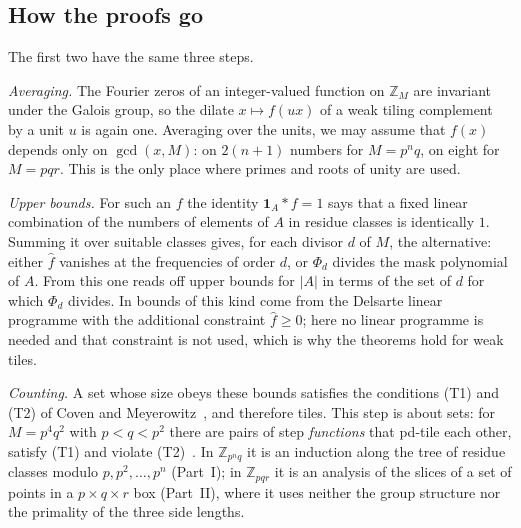 \documentclass[11pt,a4paper]{amsart}
\theoremstyle{definition}
\theoremstyle{remark}
\newcommand{\Z}{\mathbb{Z}}
\newcommand{\one}{\mathbf{1}}
\begin{document}
\subsection*{How the proofs go} The first two have the same three steps.

\emph{Averaging.} The Fourier zeros of an integer-valued function on $\Z_M$ are invariant under the Galois
group, so the dilate $x\mapsto f(ux)$ of a weak tiling complement by a unit $u$ is again one. Averaging over the
units, we may assume that $f(x)$ depends only on $\gcd(x,M)$: on $2(n+1)$ numbers for $M=p^nq$, on eight for
$M=pqr$. This is the only place where primes and roots of unity are used.

\emph{Upper bounds.} For such an $f$ the identity $\one_A*f=1$ says that a fixed linear combination of the
numbers of elements of $A$ in residue classes is identically $1$. Summing it over suitable classes gives, for
each divisor $d$ of $M$, the alternative: either $\hat f$ vanishes at the frequencies of order $d$, or $\Phi_d$
divides the mask polynomial of $A$. From this one reads off upper bounds for $|A|$ in terms of the set of $d$
for which $\Phi_d$ divides. In \cite{KLMS,KF} bounds of this kind come from the Delsarte linear programme with
the additional constraint $\hat f\ge 0$; here no linear programme is needed and that constraint is not used,
which is why the theorems hold for weak tiles.

\emph{Counting.} A set whose size obeys these bounds satisfies the conditions (T1) and (T2) of Coven and
Meyerowitz~\cite{CM}, and therefore tiles. This step is about sets: for $M=p^4q^2$ with $p<q<p^2$ there are pairs of
step \emph{functions} that pd-tile each other, satisfy (T1) and violate (T2)~\cite{KLMS}. In $\Z_{p^nq}$ it is an induction along
the tree of residue classes modulo $p,p^2,\dots,p^n$ (Part~I); in $\Z_{pqr}$ it is an analysis of the slices of
a set of points in a $p\times q\times r$ box (Part~II), where it uses neither the group structure nor the
primality of the three side lengths.
\end{document}
